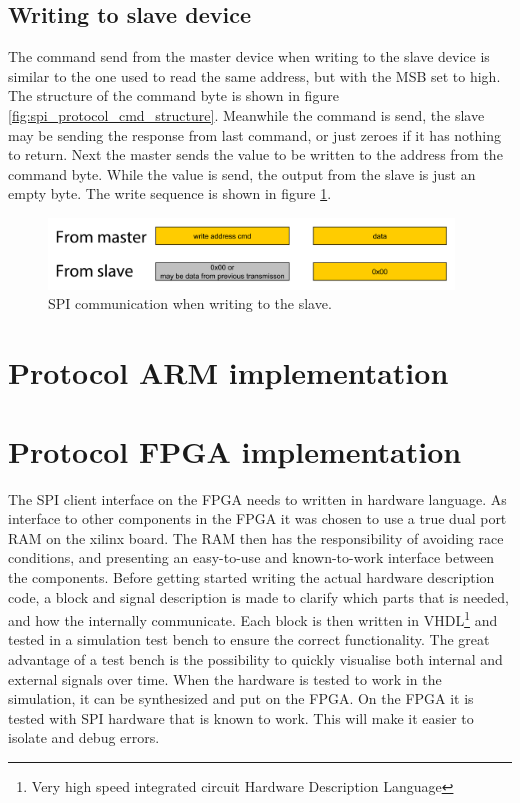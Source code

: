 \subsection{Writing to slave device}
The command send from the master device when writing to the slave device is similar to the one used to read the same address, but with the MSB set to high. The structure of the command byte is shown in figure \ref{fig:spi_protocol_cmd_structure}. Meanwhile the command is send, the slave may be sending the response from last command, or just zeroes if it has nothing to return. Next the master sends the value to be written to the address from the command byte. While the value is send, the output from the slave is just an empty byte. The write sequence is shown in figure \ref{fig:spi_protocol_command_structure_write}.

\begin{figure}[htb]
	\centering
	\includegraphics[width=0.96\textwidth]{graphics/spi_protocol_command_structure_write_wlabels.pdf} %
	\caption{SPI communication when writing to the slave.}
	\label{fig:spi_protocol_command_structure_write}			%
\end{figure}



\section{Protocol ARM implementation}


\section{Protocol FPGA implementation}
The SPI client interface on the FPGA needs to written in hardware language. As interface to other components in the FPGA it was chosen to use a true dual port RAM on the xilinx board. The RAM then has the responsibility of avoiding race conditions, and presenting an easy-to-use and known-to-work interface between the components. 
Before getting started writing the actual hardware description code, a block and signal description is made to clarify which parts that is needed, and how the internally communicate. Each block is then written in VHDL\footnote{Very high speed integrated circuit Hardware Description Language} and tested in a simulation test bench to ensure the correct functionality. The great advantage of a test bench is the possibility to quickly visualise both internal and external signals over time. When the hardware is tested to work in the simulation, it can be synthesized and put on the FPGA. On the FPGA it is tested with SPI hardware that is known to work. This will make it easier to isolate and debug errors.

